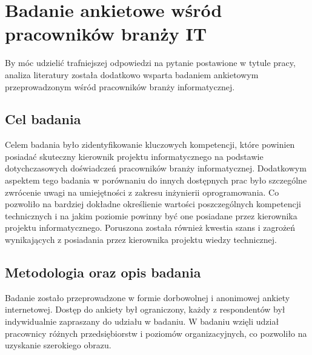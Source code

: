 \newpage

\section{Badanie ankietowe wśród pracowników branży IT}
By móc udzielić trafniejszej odpowiedzi na pytanie postawione w tytule pracy, analiza literatury została dodatkowo wsparta badaniem ankietowym przeprowadzonym wśród pracowników branży informatycznej.

\subsection{Cel badania}
Celem badania było zidentyfikowanie kluczowych kompetencji, które powinien posiadać skuteczny kierownik projektu informatycznego na podstawie dotychczasowych doświadczeń pracowników branży informatycznej. Dodatkowym aspektem tego badania w porównaniu do innych dostępnych prac było szczególne zwrócenie uwagi na umiejętności z zakresu inżynierii oprogramowania. Co pozwoliło na bardziej dokładne określienie wartości poszczególnych kompetencji technicznych i na jakim poziomie powinny być one posiadane przez kierownika projektu informatycznego. Poruszona została również kwestia szans i zagrożeń wynikających z posiadania przez kierownika projektu wiedzy technicznej.

\subsection{Metodologia oraz opis badania}
Badanie zostało przeprowadzone w formie dorbowolnej i anonimowej ankiety internetowej. Dostęp do ankiety był ograniczony, każdy z respondentów był indywidualnie zapraszany do udziału w badaniu. W badaniu wzięli udział pracownicy różnych przedsiębiorstw i poziomów organizacyjnych, co pozwoliło na uzyskanie szerokiego obrazu. 

